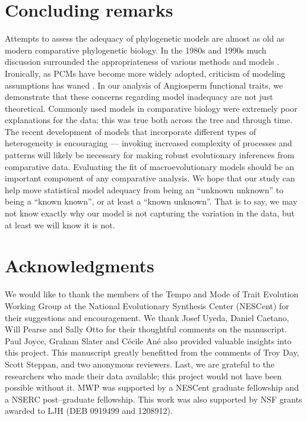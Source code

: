 \documentclass[a4paper,11pt]{article}
\begin{document}
\section{Concluding remarks}
Attempts to assess the adequacy of phylogenetic models are almost as old as modern comparative phylogenetic biology.  In the 1980s and 1990s much discussion surrounded the appropriateness of various methods and models \citep{Felsenstein1985, Felsenstein1988, HarveyPagel1991, Garland1992, Diaz1996, Price1997, Garland1999, GarlandIves2000}. Ironically, as PCMs have become more widely adopted, criticism of modeling assumptions has waned \citep[but see][for recent discussions]{Losos2011, Felsenstein2012, Hansen2012}. In our analysis of Angiosperm functional traits, we demonstrate that these concerns regarding model inadequacy are not just theoretical. Commonly used models in comparative biology were extremely poor explanations for the data; this was true both across the tree and through time. The recent development of models that incorporate different types of heterogeneity is encouraging --- invoking increased complexity of processes and patterns will likely be necessary for making robust evolutionary inferences from comparative data. Evaluating the fit of macroevolutionary models should be an important component of any comparative analysis. We hope that our study can help move statistical model adequacy from being an ``unknown unknown''  to being a ``known known'', or at least a ``known unknown''. That is to say, we may not know exactly why our model is not capturing the variation in the data, but at least we will know it is not.


\section{Acknowledgments}
We would like to thank the members of the Tempo and Mode of Trait Evolution Working Group at the National Evolutionary Synthesis Center (NESCent) for their suggestions and encouragement. We thank Josef Uyeda, Daniel Caetano, Will Pearse and Sally Otto for their thoughtful comments on the manuscript. Paul Joyce, Graham Slater and C\'{e}cile An\'{e} also provided valuable insights into this project. This manuscript greatly benefitted from the comments of Troy Day, Scott Steppan, and two anonymous reviewers. Last, we are grateful to the researchers who made their data available; this project would not have been possible without it. MWP was supported by a NESCent graduate fellowship and a NSERC post--graduate fellowship. This work was also supported by NSF grants awarded to LJH (DEB 0919499 and 1208912).
\end{document}
